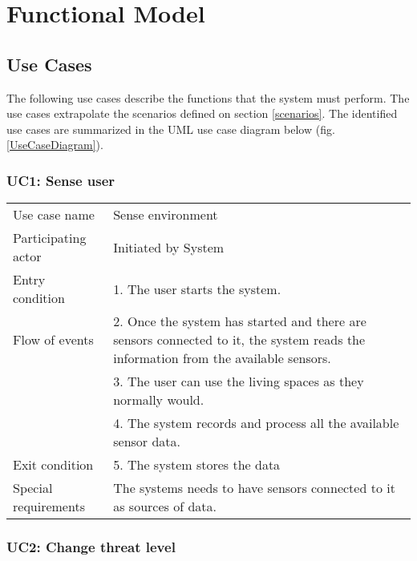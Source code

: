 \section{Functional Model}
\subsection{Use Cases}

The following use cases describe the functions that the system must perform. The use cases extrapolate the scenarios defined on section \ref{scenarios}. The identified use cases are summarized in the UML use case diagram below (fig. \ref{UseCaseDiagram}).



\subsubsection{UC1: Sense user}

\begin{tabular}{ l p{11cm} }
	\hline                       
	Use case name & Sense environment\\
	Participating actor & Initiated by System \\
	Entry condition & 1. The user starts the system. \\
	Flow of events & 2. Once the system has started and there are sensors connected to it, the system reads the information from the available sensors.\\
	& 3. The user can use the living spaces as they normally would. \\
	& 4. The system records and process all the available sensor data. \\	
	Exit condition & 5. The system stores the data \\
	Special requirements & The systems needs to have sensors connected to it as sources of data. \\
	\hline
\end{tabular}

\subsubsection{UC2: Change threat level}

